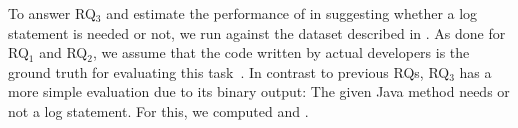 To answer RQ$_3$ and estimate the performance of \approach in suggesting whether a log statement is needed or not, we run \approach against the dataset described in . As done for RQ$_1$ and RQ$_2$, we assume that the code written by actual developers is the ground truth for evaluating this task~\cite{MASTRO_17_30_40_41}. In contrast to previous RQs, RQ$_3$ has a more simple evaluation due to its binary output: The given Java method needs or not a log statement. For this, we computed {\color{red}{precision}} and {\color{red}{recall}}.